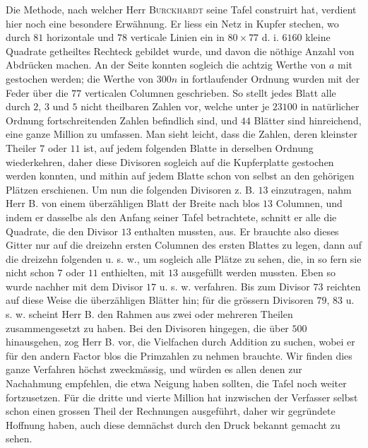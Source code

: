 Die Methode, nach welcher Herr \textsc{Burckhardt} seine Tafel construirt hat, verdient hier noch eine besondere Erwähnung. Er liess ein Netz in Kupfer stechen, wo durch $81$ horizontale und $78$ verticale Linien ein in $80\times77$ d. i. $6160$ kleine Quadrate getheiltes Rechteck gebildet wurde, und davon die nöthige Anzahl von Abdrücken machen. An der Seite konnten sogleich die achtzig Werthe
%
von $a$ mit gestochen werden; die Werthe von $300n$ in fortlaufender Ordnung wurden mit der Feder über die $77$ verticalen Columnen geschrieben. So stellt jedes Blatt alle durch $2$, $3$ und $5$ nicht theilbaren Zahlen vor, welche unter je $23100$ in natürlicher Ordnung fortschreitenden Zahlen befindlich sind, und $44$ Blätter sind hinreichend, eine ganze Million zu umfassen. Man sieht leicht, dass die Zahlen, deren kleinster Theiler $7$ oder $11$ ist, auf jedem folgenden Blatte in derselben Ordnung wiederkehren, daher diese Divisoren sogleich auf die Kupferplatte gestochen werden konnten, und mithin auf jedem Blatte schon von selbst an den gehörigen Plätzen erschienen. Um nun die folgenden Divisoren z. B. $13$ einzutragen, nahm Herr B. von einem überzähligen Blatt der Breite nach blos $13$ Columnen, und indem er dasselbe als den Anfang seiner Tafel betrachtete, schnitt er alle die Quadrate, die den Divisor $13$ enthalten mussten, aus. Er brauchte also dieses Gitter nur auf die dreizehn ersten Columnen des ersten Blattes zu legen, dann auf die dreizehn folgenden u. s. w., um sogleich alle Plätze zu sehen, die, in so fern sie nicht schon $7$ oder $11$ enthielten, mit $13$ ausgefüllt werden mussten. Eben so wurde nachher mit dem Divisor $17$ u. s. w. verfahren. Bis zum Divisor $73$ reichten auf diese Weise die überzähligen Blätter hin; für die grössern Divisoren $79$, $83$ u. s. w. scheint Herr B. den Rahmen aus zwei oder mehreren Theilen zusammengesetzt zu haben. Bei den Divisoren hingegen, die über $500$ hinausgehen, zog Herr B. vor, die Vielfachen durch Addition zu suchen, wobei er für den andern Factor blos die Primzahlen zu nehmen brauchte. Wir finden dies ganze Verfahren höchst zweckmässig, und würden es allen denen zur Nachahmung empfehlen, die etwa Neigung haben sollten, die Tafel noch weiter fortzusetzen. Für die dritte und vierte Million hat inzwischen der Verfasser selbst schon einen grossen Theil der Rechnungen ausgeführt, daher wir gegründete Hoffnung haben, auch diese demnächst durch den Druck bekannt gemacht zu sehen.

